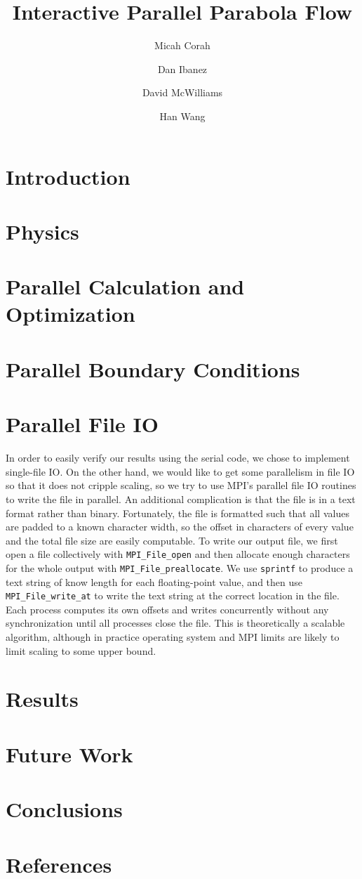 \documentclass[twocolumn]{article}
\title{Interactive Parallel Parabola Flow}
\author{
Micah Corah
\and
Dan Ibanez
\and
David McWilliams
\and
Han Wang
}
\begin{document}
\maketitle
\section{Introduction}
\section{Physics}
\section{Parallel Calculation and Optimization}
\section{Parallel Boundary Conditions}
\section{Parallel File IO}
In order to easily verify our results using the serial code,
we chose to implement single-file IO.
On the other hand, we would like to get some parallelism in
file IO so that it does not cripple scaling, so we try to use
MPI's parallel file IO routines to write the file in parallel.
An additional complication is that the file is in a text format
rather than binary.
Fortunately, the file is formatted such that all values are
padded to a known character width, so the offset in characters
of every value and the total file size are easily computable.
To write our output file, we first open a file collectively
with \texttt{MPI\_File\_open} and then 
allocate enough characters for the whole output with
\texttt{MPI\_File\_preallocate}.
We use
\texttt{sprintf} to produce a text string of know length for
each floating-point value, and then use
\texttt{MPI\_File\_write\_at} to write the text string at
the correct location in the file.
Each process computes its own offsets and writes concurrently
without any synchronization until all processes close the file.
This is theoretically a scalable algorithm, although in practice
operating system and MPI limits are likely to limit scaling
to some upper bound.
\section{Results}
\section{Future Work}
\section{Conclusions}
\section{References}
\end{document}
